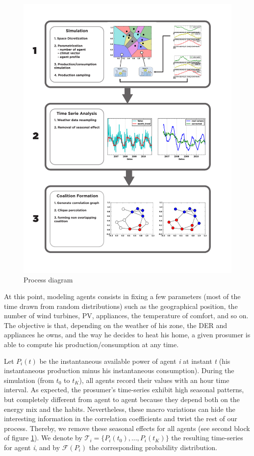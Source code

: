 \documentclass[conference]{IEEEtran}
\begin{document}
\begin{center}
\begin{figure}
\includegraphics[scale=0.51]{figure2/Fig2}
\caption{Process diagram}
\label{Fig1}
\end{figure}
\end{center}

At this point, modeling agents consists in fixing a few parameters (most of the time drawn from random distributions) such as the geographical position, the number of wind turbines, PV, appliances, the temperature of comfort, and so on. The objective is that, depending on the weather of his zone, the DER and appliances he owns, and the way he decides to heat his home, a given prosumer is able to compute his production/consumption at any time. 

Let $ P_{i}(t) $ be the instantaneous available power of agent \textit{i} at instant \textit{t} (his instantaneous production minus his instantaneous consumption). During the simulation (from $t_{0} $ to $ t_{K} $), all agents record their values with an hour time interval. As expected, the prosumer's time-series exhibit high seasonal patterns, but completely different from agent to agent because they depend both on the energy mix and the habits. Nevertheless, these macro variations can hide the interesting information in the correlation coefficients and twist the rest of our process. Thereby, we remove these seasonal effects for all agents (see second block of figure \ref{Fig1}). We denote by $ \mathcal{T}_{i} = \{ P_{i}(t_{0}),...,P_{i}(t_{K}) \} $ the resulting time-series for  agent \textit{i}, and by $ \mathcal{F}(P_{i}) $ the corresponding probability distribution.
\end{document}
